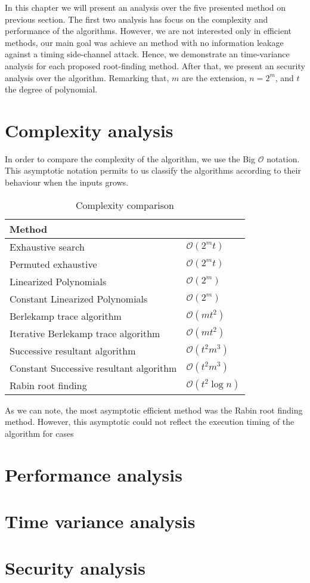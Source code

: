 In this chapter we will present an analysis over the five presented method on previous section. The first two analysis has focus on the complexity and performance of the algorithms. However, we are not interested only in efficient methods, our main goal was achieve an method with no information leakage against a timing side-channel attack. Hence, we demonstrate an time-variance analysis for each proposed root-finding method. After that, we present an security analysis over the algorithm. Remarking that, $m$ are the extension, $n = 2^m$, and $t$ the degree of polynomial.

\section{Complexity analysis}
In order to compare the complexity of the algorithm, we use the Big $\mathcal{O}$ notation. This asymptotic notation permits to us classify the algorithms according to their behaviour when the inputs grows. 




\begin{table}[ht]
\centering
\label{tab:complexity}
\caption{Complexity comparison}
\begin{tabular}{ll}
Method                                  &                \\ \hline
Exhaustive search                       & $\mathcal{O}(2^mt)$ \\
Permuted exhaustive                     & $\mathcal{O}(2^mt)$ \\
Linearized Polynomials                  & $\mathcal{O}(2^m)$ \\
Constant Linearized Polynomials         & $\mathcal{O}(2^m)$ \\
Berlekamp trace algorithm               & $\mathcal{O}(mt^2)$ \\
Iterative Berlekamp trace algorithm     & $\mathcal{O}(mt^2)$ \\
Successive resultant algorithm          & $\mathcal{O}(t^2m^3)$ \\
Constant Successive resultant algorithm & $\mathcal{O}(t^2m^3)$ \\
Rabin root finding                      & $\mathcal{O}(t^2 \log{n})$
\end{tabular}
\end{table}

As we can note, the most asymptotic efficient method was the Rabin root finding method. However, this asymptotic could not reflect the execution timing of the algorithm for cases 

\section{Performance analysis}
\section{Time variance analysis}
\section{Security analysis}